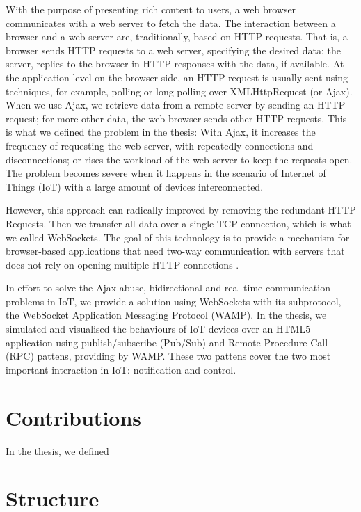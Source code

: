 With the purpose of presenting rich content to users, a web browser communicates with a web server to fetch the data. The interaction between a browser and a web server are, traditionally, based on HTTP requests. That is, a browser sends HTTP requests to a web server, specifying the desired data; the server, replies to the browser in HTTP responses with the data, if available. At the application level on the browser side, an HTTP request is usually sent using techniques, for example, polling or long-polling over XMLHttpRequest (or Ajax). When we use Ajax, we retrieve data from a remote server by sending an HTTP request; for more other data, the web browser sends other HTTP requests. This is what we defined the problem in the thesis: With Ajax, it increases the frequency of requesting the web server, with repeatedly connections and disconnections; or rises the workload of the web server to keep the requests open. The problem becomes severe when it happens in the scenario of Internet of Things (IoT) with a large amount of devices interconnected.

However, this approach can radically improved by removing the redundant HTTP Requests. Then we transfer all data over a single TCP connection, which is what we called WebSockets. The goal of this technology is to provide a mechanism for browser-based applications that need two-way communication with servers that does not rely on opening multiple HTTP connections \cite{rfc64552012web}.

In effort to solve the Ajax abuse, bidirectional and real-time communication problems in IoT, we provide a solution using WebSockets with its subprotocol, the WebSocket Application Messaging Protocol (WAMP). In the thesis, we simulated and visualised the behaviours of IoT devices over an HTML5 application using publish/subscribe (Pub/Sub) and Remote Procedure Call (RPC) pattens, providing by WAMP. These two pattens cover the two most important interaction in IoT: notification and control.

\section{Contributions}

In the thesis, we defined 
\section{Structure}